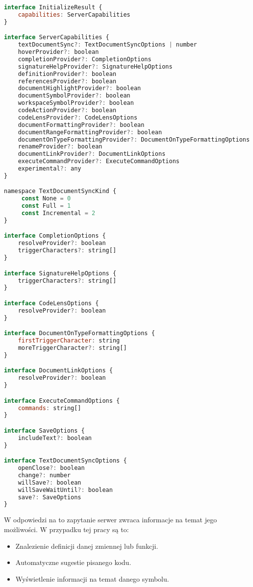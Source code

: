\begin{lstlisting}[language=JavaScript, basicstyle=\fontsize{9}{10}\ttfamily]
interface InitializeResult {
    capabilities: ServerCapabilities
}

interface ServerCapabilities {
    textDocumentSync?: TextDocumentSyncOptions | number
    hoverProvider?: boolean
    completionProvider?: CompletionOptions
    signatureHelpProvider?: SignatureHelpOptions
    definitionProvider?: boolean
    referencesProvider?: boolean
    documentHighlightProvider?: boolean
    documentSymbolProvider?: boolean
    workspaceSymbolProvider?: boolean
    codeActionProvider?: boolean
    codeLensProvider?: CodeLensOptions
    documentFormattingProvider?: boolean
    documentRangeFormattingProvider?: boolean
    documentOnTypeFormattingProvider?: DocumentOnTypeFormattingOptions
    renameProvider?: boolean
    documentLinkProvider?: DocumentLinkOptions
    executeCommandProvider?: ExecuteCommandOptions
    experimental?: any
}

namespace TextDocumentSyncKind {
     const None = 0
     const Full = 1
     const Incremental = 2
}

interface CompletionOptions {
    resolveProvider?: boolean
    triggerCharacters?: string[]
}

interface SignatureHelpOptions {
    triggerCharacters?: string[]
}

interface CodeLensOptions {
    resolveProvider?: boolean
}

interface DocumentOnTypeFormattingOptions {
    firstTriggerCharacter: string
    moreTriggerCharacter?: string[]
}

interface DocumentLinkOptions {
    resolveProvider?: boolean
}

interface ExecuteCommandOptions {
    commands: string[]
}

interface SaveOptions {
    includeText?: boolean
}

interface TextDocumentSyncOptions {
    openClose?: boolean
    change?: number
    willSave?: boolean
    willSaveWaitUntil?: boolean
    save?: SaveOptions
}
\end{lstlisting}
W odpowiedzi na to zapytanie serwer zwraca informacje na temat jego możliwości. W przypadku tej pracy są to:

\begin{itemize}
    \item Znalezienie definicji danej zmiennej lub funkcji.
    \item Automatyczne sugestie pisanego kodu.
    \item Wyświetlenie informacji na temat danego symbolu.
\end{itemize}

